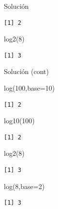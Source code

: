 \documentclass[
  ignorenonframetext,
  aspectratio=169,
  spanish,
]{beamer}
\newenvironment{Shaded}{\begin{snugshade}}{\end{snugshade}}
\newcommand{\AttributeTok}[1]{\textcolor[rgb]{0.40,0.45,0.13}{#1}}
\newcommand{\DecValTok}[1]{\textcolor[rgb]{0.68,0.00,0.00}{#1}}
\newcommand{\FunctionTok}[1]{\textcolor[rgb]{0.28,0.35,0.67}{#1}}
\newcommand{\NormalTok}[1]{\textcolor[rgb]{0.00,0.23,0.31}{#1}}
\begin{document}
\begin{frame}[fragile]{Solución}
\begin{verbatim}
[1] 2
\end{verbatim}

\begin{Shaded}
\begin{Highlighting}[]
\FunctionTok{log2}\NormalTok{(}\DecValTok{8}\NormalTok{)}
\end{Highlighting}
\end{Shaded}

\begin{verbatim}
[1] 3
\end{verbatim}
\end{frame}

\begin{frame}[fragile]{Solución (cont)}
\label{soluciuxf3n-cont}
\begin{Shaded}
\begin{Highlighting}[]
\FunctionTok{log}\NormalTok{(}\DecValTok{100}\NormalTok{,}\AttributeTok{base=}\DecValTok{10}\NormalTok{)}
\end{Highlighting}
\end{Shaded}

\begin{verbatim}
[1] 2
\end{verbatim}

\begin{Shaded}
\begin{Highlighting}[]
\FunctionTok{log10}\NormalTok{(}\DecValTok{100}\NormalTok{) }
\end{Highlighting}
\end{Shaded}

\begin{verbatim}
[1] 2
\end{verbatim}

\begin{Shaded}
\begin{Highlighting}[]
\FunctionTok{log2}\NormalTok{(}\DecValTok{8}\NormalTok{)}
\end{Highlighting}
\end{Shaded}

\begin{verbatim}
[1] 3
\end{verbatim}

\begin{Shaded}
\begin{Highlighting}[]
\FunctionTok{log}\NormalTok{(}\DecValTok{8}\NormalTok{,}\AttributeTok{base=}\DecValTok{2}\NormalTok{)}
\end{Highlighting}
\end{Shaded}

\begin{verbatim}
[1] 3
\end{verbatim}
\end{frame}
\end{document}
